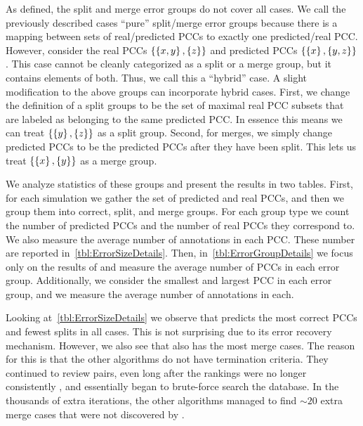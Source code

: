     As defined, the split and merge error groups do not cover all cases.
    We call the previously described cases ``pure'' split/merge error groups because there is a mapping between
      sets of real/predicted PCCs to exactly one predicted/real PCC.
    However, consider the real PCCs $\left\{\left\{x, y\right\}, \left\{z\right\}\right\}$ and predicted PCCs $\left\{\left\{x\right\},
      \left\{y, z\right\}\right\}$.
    This case cannot be cleanly categorized as a split or a merge group, but it contains elements of both.
    Thus, we call this a ``hybrid'' case.
    A slight modification to the above groups can incorporate hybrid cases.
    First, we change the definition of a split groups to be the set of maximal real PCC subsets that are labeled
      as belonging to the same predicted PCC.
    In essence this means we can treat $\left\{\left\{y\right\}, \left\{z\right\}\right\}$ as a split group.
    Second, for merges, we simply change predicted PCCs to be the predicted PCCs after they have been split.
    This lets us treat $\left\{\left\{x\right\}, \left\{y\right\}\right\}$ as a merge group.


    We analyze statistics of these groups and present the results in two tables.
    First, for each simulation we gather the set of predicted and real PCCs, and then we group them into correct,
      split, and merge groups.
    For each group type we count the number of predicted PCCs and the number of real PCCs they correspond to.
    We also measure the average number of annotations in each PCC.
    These number are reported in~\cref{tbl:ErrorSizeDetails}.
    Then, in~\cref{tbl:ErrorGroupDetails} we focus only on the results of  and measure the average
      number of PCCs in each error group.
    Additionally, we consider the smallest and largest PCC in each error group, and we measure the average number
      of annotations in each.

    Looking at~\cref{tbl:ErrorSizeDetails} we observe that  predicts the most correct PCCs and fewest
      splits in all cases.
    This is not surprising due to its error recovery mechanism.
    However, we also see that  also has the most merge cases.
    The reason for this is that the other algorithms do not have termination criteria.
    They continued to review pairs, even long after the rankings were no longer consistently \meaningful{}, and
      essentially began to brute-force search the database.
    In the thousands of extra iterations, the other algorithms managed to find ${\sim}20$ extra merge cases that
      were not discovered by .

